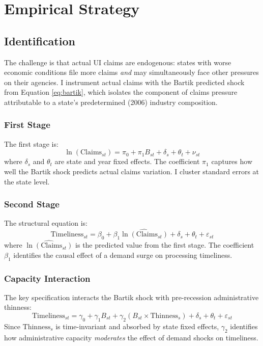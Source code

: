 \documentclass[12pt]{article}
\begin{document}


\section{Empirical Strategy}

\subsection{Identification}

The challenge is that actual UI claims are endogenous: states with worse economic conditions file more claims \emph{and} may simultaneously face other pressures on their agencies. I instrument actual claims with the Bartik predicted shock from Equation \eqref{eq:bartik}, which isolates the component of claims pressure attributable to a state's predetermined (2006) industry composition.

\subsubsection*{First Stage} The first stage is:
\begin{equation}
\ln(\text{Claims}_{st}) = \pi_0 + \pi_1 B_{st} + \delta_s + \theta_t + \nu_{st}
\end{equation}
where $\delta_s$ and $\theta_t$ are state and year fixed effects. The coefficient $\pi_1$ captures how well the Bartik shock predicts actual claims variation. I cluster standard errors at the state level.

\subsubsection*{Second Stage} The structural equation is:
\begin{equation}
\text{Timeliness}_{st} = \beta_0 + \beta_1 \widehat{\ln(\text{Claims}_{st})} + \delta_s + \theta_t + \varepsilon_{st}
\end{equation}
where $\widehat{\ln(\text{Claims}_{st})}$ is the predicted value from the first stage. The coefficient $\beta_1$ identifies the causal effect of a demand surge on processing timeliness.

\subsubsection*{Capacity Interaction} The key specification interacts the Bartik shock with pre-recession administrative thinness:
\begin{equation}
\text{Timeliness}_{st} = \gamma_0 + \gamma_1 B_{st} + \gamma_2 (B_{st} \times \text{Thinness}_s) + \delta_s + \theta_t + \varepsilon_{st}
\label{eq:interaction}
\end{equation}
Since $\text{Thinness}_s$ is time-invariant and absorbed by state fixed effects, $\gamma_2$ identifies how administrative capacity \emph{moderates} the effect of demand shocks on timeliness.
\end{document}
